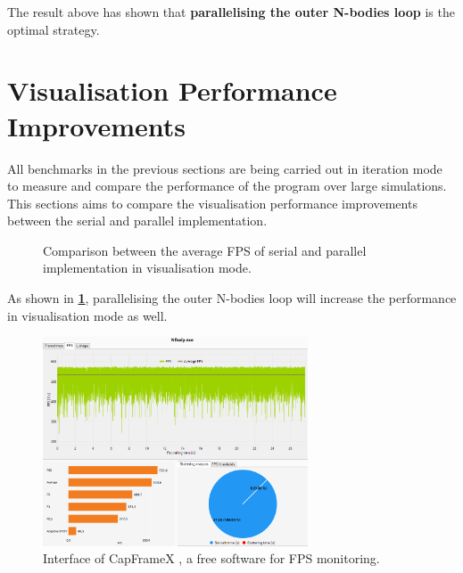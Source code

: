 \documentclass[12pt, a4paper]{article}
\let\oldcref\cref
\renewcommand{\cref}[1]{\textbf{\oldcref{#1}}}
\begin{document}
The result above has shown that \textbf{parallelising the outer N-bodies loop} is the optimal strategy.

\newpage
\section{Visualisation Performance Improvements} \label{sec:visualisation_performance}
All benchmarks in the previous sections are being carried out in iteration mode to measure and
compare the performance of the program over large simulations. This sections aims to compare the
visualisation performance improvements between the serial and parallel implementation.

\begin{figure}[ht]
  \centering
  \caption{Comparison between the average FPS of serial and parallel implementation in visualisation mode.}
  \label{fig:average_fps_comparison}
\end{figure}

As shown in \cref{fig:average_fps_comparison}, parallelising the outer N-bodies loop will increase
the performance in visualisation mode as well.

\begin{figure}[H]
  \centering
  \includegraphics[width=0.7\textwidth]{images/capframex.png}
  \caption{Interface of CapFrameX \cite{capframex}, a free software for FPS monitoring.}
\end{figure}

\printbibliography
\end{document}
